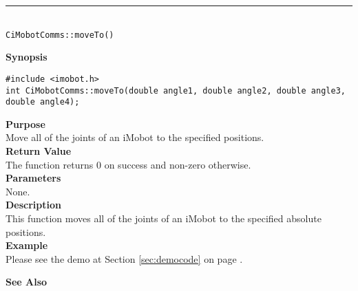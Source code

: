 \noindent
\vspace{5pt}
\rule{4.5in}{0.015in}\\
\noindent
{\LARGE \texttt{CiMobotComms::moveTo()}}\\
{}

\noindent
{\bf Synopsis}\\
\begin{verbatim}
#include <imobot.h>
int CiMobotComms::moveTo(double angle1, double angle2, double angle3, double angle4);
\end{verbatim}

\noindent
{\bf Purpose}\\
Move all of the joints of an iMobot to the specified positions.\\

\noindent
{\bf Return Value}\\
The function returns 0 on success and non-zero otherwise.\\

\noindent
{\bf Parameters}\\
None.\\

\noindent
{\bf Description}\\
This function moves all of the joints of an iMobot to the specified absolute positions. \\

\noindent
{\bf Example}\\
Please see the demo at Section \ref{sec:democode} on page \pageref{sec:democode}.\\
\noindent

\noindent
{\bf See Also}\\

